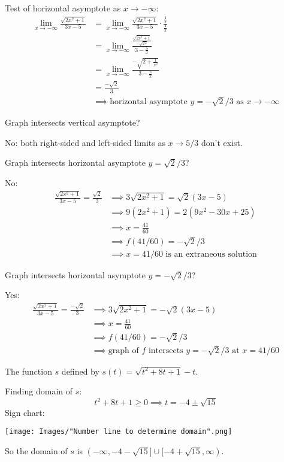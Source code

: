 \documentclass[nooutcomes]{ximera}
\renewenvironment{freeResponse}{
\ifhandout\setbox0\vbox\bgroup\else
\begin{trivlist}\item[\hskip \labelsep\bfseries Solution:\hspace{2ex}]
\fi}
{\ifhandout\egroup\else
\end{trivlist}
\fi}
\begin{document}
\begin{problem}
\begin{itemize}
\begin{freeResponse}
        Test of horizontal asymptote as $x \to -\infty$:
        \begin{align*}
          \lim_{x \to -\infty} \frac{\sqrt{2x^2 + 1}}{3x-5}
          &= \lim_{x \to -\infty} \frac{\sqrt{2x^2 + 1}}{3x-5} \cdot \frac{\frac{1}{x}}{\frac{1}{x}} \\
          &= \lim_{x \to -\infty}  \frac{\frac{\sqrt{2x^2 + 1}}{-\sqrt{x^2}}}{3 - \frac{5}{x}}\\
          &= \lim_{x \to -\infty}  \frac{-\sqrt{2 + \frac{1}{x^2}}}{3 - \frac{5}{x}} \\
          &= \frac{-\sqrt{2}}{3} \\
          &\implies \mbox{horizontal asymptote $y = -\sqrt{2}/3$ as $x \to -\infty$}
        \end{align*}

        Graph intersects vertical asymptote?

        No: both right-sided and left-sided limits as $x \to 5/3$ don't exist.

        Graph intersects horizontal asymptote $y = \sqrt{2}/3$?
        
        No:
        \begin{align*}
          \frac{\sqrt{2x^2 + 1}}{3x-5} = \frac{\sqrt{2}}{3} &\implies 3 \sqrt{2x^2+1} = \sqrt{2}(3x-5)\\
          &\implies 9 (2x^2 + 1) = 2(9x^2 - 30x + 25) \\
          &\implies x = \frac{41}{60}\\
          &\implies f(41/60) = - \sqrt{2}/3\\
          &\implies \mbox{$x = 41/60$ is an extraneous solution}
        \end{align*}

        Graph intersects horizontal asymptote $y = -\sqrt{2}/3$?
        
        Yes:
        \begin{align*}
          \frac{\sqrt{2x^2 + 1}}{3x-5} = \frac{-\sqrt{2}}{3}
          &\implies 3 \sqrt{2x^2+1} = -\sqrt{2}(3x-5)\\
          &\implies x = \frac{41}{60}\\
          &\implies f(41/60) = - \sqrt{2}/3\\
          &\implies \mbox{graph of $f$ intersects $y = -\sqrt{2}/3$ at $x = 41/60$}
        \end{align*}
      \end{freeResponse}


    \item[(b)] The function $s$ defined by $\displaystyle s(t) = \sqrt{t^2 + 8t + 1} - t$.
      \begin{freeResponse}
        Finding domain of $s$:
        \[
          t^2 + 8t + 1 \ge 0 \implies t = -4 \pm \sqrt{15}
        \]
        Sign chart:
        \begin{image}
          \texttt{[image: Images/"Number line to determine domain".png]}
        \end{image}
      \end{freeResponse}
      So the domain of $s$ is $(-\infty, -4 -\sqrt{15}] \cup [-4+\sqrt{15}, \infty)$.


\end{itemize}
\end{problem}
\end{document}

